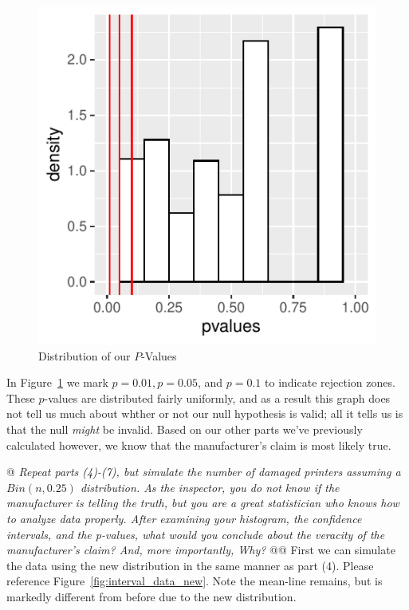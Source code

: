 \documentclass[10pt]{report}\usepackage[]{graphicx}\usepackage[]{xcolor}
\makeatletter
\def\maxwidth{ %
  \ifdim\Gin@nat@width>\linewidth
    \linewidth
  \else
    \Gin@nat@width
  \fi
}
\newenvironment{knitrout}{}{} %
\makeatother
\begin{document}
\begin{easylist}[enumerate]
\begin{knitrout}
\begin{figure}[H]
{\centering \includegraphics[width=\maxwidth]{figure/pvalues-1} 

}

\caption[Distribution of our $P$-Values]{Distribution of our $P$-Values}\label{fig:pvalues}
\end{figure}


\end{knitrout}

        In Figure~\ref{fig:pvalues} we mark $p=0.01, p=0.05$, and $p=0.1$ to indicate rejection zones. These $p$-values
        are distributed fairly uniformly, and as a result this graph does not tell us much about whther or not our null
        hypothesis is valid; all it tells us is that the null \textit{might} be invalid. Based on our other parts we've
        previously calculated however, we know that the manufacturer's claim is most likely true.

        \newpage
        @ \textit{Repeat parts (4)-(7), but simulate the number of damaged printers assuming a $Bin(n, 0.25)$
        distribution. As the inspector, you do not know if the manufacturer is telling the truth, but you are a great
        statistician who knows how to analyze data properly. After examining your histogram, the confidence intervals, and
        the p-values, what would you conclude about the veracity of the manufacturer's claim? And, more importantly,
        Why?}\newline
        @@ First we can simulate the data using the new distribution in the same manner as part (4). Please reference
        Figure~\ref{fig:interval_data_new}. Note the mean-line remains, but is markedly different from before due to the
        new distribution.


\end{easylist}
\end{document}
